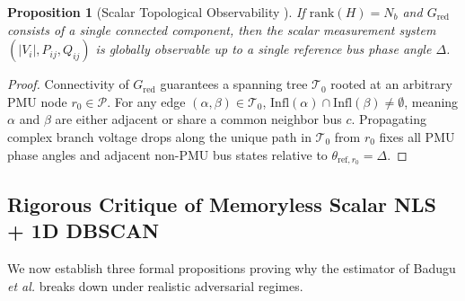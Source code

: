 \documentclass[journal,twoside]{IEEEtran}
\newtheorem{proposition}{Proposition}
\begin{document}
\begin{proposition}[Scalar Topological Observability \cite{badugu2026synchrophasor}]
If $\mathrm{rank}(H) = N_b$ and $G_{\mathrm{red}}$ consists of a single connected component, then the scalar measurement system $(|V_i|, P_{ij}, Q_{ij})$ is globally observable up to a single reference bus phase angle $\Delta$.
\end{proposition}
\begin{proof}
Connectivity of $G_{\mathrm{red}}$ guarantees a spanning tree $\mathcal{T}_0$ rooted at an arbitrary PMU node $r_0 \in \mathcal{P}$. For any edge $(\alpha, \beta) \in \mathcal{T}_0$, $\mathrm{Infl}(\alpha) \cap \mathrm{Infl}(\beta) \neq \emptyset$, meaning $\alpha$ and $\beta$ are either adjacent or share a common neighbor bus $c$. Propagating complex branch voltage drops along the unique path in $\mathcal{T}_0$ from $r_0$ fixes all PMU phase angles and adjacent non-PMU bus states relative to $\theta_{\mathrm{ref},r_0} = \Delta$.
\end{proof}

\subsection{Rigorous Critique of Memoryless Scalar NLS + 1D DBSCAN}
We now establish three formal propositions proving why the estimator of Badugu \emph{et al.} \cite{badugu2026synchrophasor} breaks down under realistic adversarial regimes.
\end{document}

